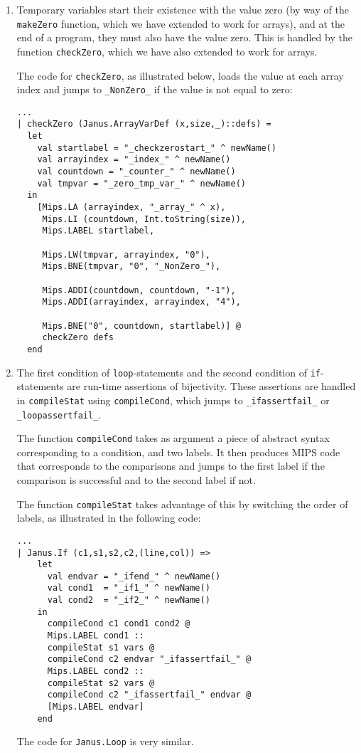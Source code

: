 \begin{enumerate}
  \item Temporary variables start their existence with the value zero (by way of
        the \verb+makeZero+ function, which we have extended to work for
        arrays), and at the end of a program, they must also have the value
        zero.  This is handled by the function \verb+checkZero+, which we have
        also extended to work for arrays.

        The code for \verb+checkZero+, as illustrated below, loads the value at
        each array index and jumps to \verb+_NonZero_+ if the value is not equal
        to zero:
\begin{verbatim}
...
| checkZero (Janus.ArrayVarDef (x,size,_)::defs) =
  let
    val startlabel = "_checkzerostart_" ^ newName()
    val arrayindex = "_index_" ^ newName()
    val countdown = "_counter_" ^ newName()
    val tmpvar = "_zero_tmp_var_" ^ newName()
  in
    [Mips.LA (arrayindex, "_array_" ^ x),
     Mips.LI (countdown, Int.toString(size)),
     Mips.LABEL startlabel,

     Mips.LW(tmpvar, arrayindex, "0"),
     Mips.BNE(tmpvar, "0", "_NonZero_"),

     Mips.ADDI(countdown, countdown, "-1"),
     Mips.ADDI(arrayindex, arrayindex, "4"),

     Mips.BNE("0", countdown, startlabel)] @
     checkZero defs
  end
\end{verbatim}

  \item The first condition of {\tt loop}-statements and the second condition
        of {\tt if}-statements are run-time assertions of bijectivity. 
        These assertions are handled in {\tt compileStat} using {\tt compileCond}, 
        which jumps to {\tt \_ifassertfail\_} or {\tt \_loopassertfail\_}.

        The function \verb+compileCond+ takes as argument a piece of abstract
        syntax corresponding to a condition, and two labels. It then produces
        MIPS code that corresponds to the comparisons and jumps to the first
        label if the comparison is successful and to the second label if not.

        The function \verb+compileStat+ takes advantage of this by switching the
        order of labels, as illustrated in the following code:

\begin{verbatim}
...
| Janus.If (c1,s1,s2,c2,(line,col)) =>
    let
      val endvar = "_ifend_" ^ newName()
      val cond1  = "_if1_" ^ newName()
      val cond2  = "_if2_" ^ newName()
    in
      compileCond c1 cond1 cond2 @
      Mips.LABEL cond1 ::
      compileStat s1 vars @
      compileCond c2 endvar "_ifassertfail_" @
      Mips.LABEL cond2 ::
      compileStat s2 vars @
      compileCond c2 "_ifassertfail_" endvar @
      [Mips.LABEL endvar]
    end
\end{verbatim}

The code for \verb+Janus.Loop+ is very similar.

\end{enumerate}

